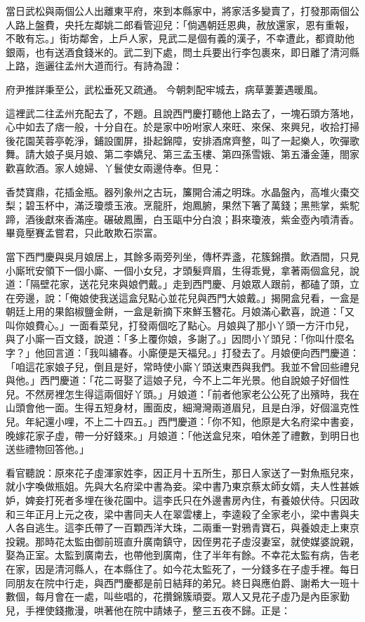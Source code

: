 當日武松與兩個公人出離東平府，來到本縣家中，將家活多變賣了，打發那兩個公人路上盤費，央托左鄰姚二郎看管迎兒：「倘遇朝廷恩典，赦放還家，恩有重報，不敢有忘。」街坊鄰舍，上戶人家，見武二是個有義的漢子，不幸遭此，都資助他銀兩，也有送酒食錢米的。武二到下處，問土兵要出行李包裹來，即日離了清河縣上路，迤邐往孟州大道而行。有詩為證：

府尹推詳秉至公，武松垂死又疏通。
今朝刺配牢城去，病草萋萋遇暖風。

這裡武二往孟州充配去了，不題。且說西門慶打聽他上路去了，一塊石頭方落地，心中如去了痞一般，十分自在。於是家中吩咐家人來旺、來保、來興兒，收拾打掃後花園芙蓉亭乾淨，鋪設圍屏，掛起錦障，安排酒席齊整，叫了一起樂人，吹彈歌舞。請大娘子吳月娘、第二李嬌兒、第三孟玉樓、第四孫雪娥、第五潘金蓮，閤家歡喜飲酒。家人媳婦、丫鬟使女兩邊侍奉。但見：

香焚寶鼎，花插金瓶。器列象州之古玩，簾開合浦之明珠。水晶盤內，高堆火棗交梨；碧玉杯中，滿泛瓊漿玉液。烹龍肝，炮鳳腑，果然下箸了萬錢；黑熊掌，紫駝蹄，酒後獻來香滿座。碾破鳳團，白玉甌中分白浪；斟來瓊液，紫金壺內噴清香。畢竟壓賽孟嘗君，只此敢欺石崇富。

當下西門慶與吳月娘居上，其餘多兩旁列坐，傳杯弄盞，花簇錦攢。飲酒間，只見小廝玳安領下一個小廝、一個小女兒，才頭髮齊眉，生得乖覺，拿著兩個盒兒，說道：「隔壁花家，送花兒來與娘們戴。」走到西門慶、月娘眾人跟前，都磕了頭，立在旁邊，說：「俺娘使我送這盒兒點心並花兒與西門大娘戴。」揭開盒兒看，一盒是朝廷上用的果餡椒鹽金餅，一盒是新摘下來鮮玉簪花。月娘滿心歡喜，說道：「又叫你娘費心。」一面看菜兒，打發兩個吃了點心。月娘與了那小丫頭一方汗巾兒，與了小廝一百文錢，說道：「多上覆你娘，多謝了。」因問小丫頭兒：「你叫什麼名字？」他回言道：「我叫繡春。小廝便是天福兒。」打發去了。月娘便向西門慶道：「咱這花家娘子兒，倒且是好，常時使小廝丫頭送東西與我們。我並不曾回些禮兒與他。」西門慶道：「花二哥娶了這娘子兒，今不上二年光景。他自說娘子好個性兒。不然房裡怎生得這兩個好丫頭。」月娘道：「前者他家老公公死了出殯時，我在山頭會他一面。生得五短身材，團面皮，細灣灣兩道眉兒，且是白淨，好個溫克性兒。年紀還小哩，不上二十四五。」西門慶道：「你不知，他原是大名府梁中書妾，晚嫁花家子虛，帶一分好錢來。」月娘道：「他送盒兒來，咱休差了禮數，到明日也送些禮物回答他。」

看官聽說：原來花子虛渾家姓李，因正月十五所生，那日人家送了一對魚瓶兒來，就小字喚做瓶姐。先與大名府梁中書為妾。梁中書乃東京蔡太師女婿，夫人性甚嫉妒，婢妾打死者多埋在後花園中。這李氏只在外邊書房內住，有養娘伏侍。只因政和三年正月上元之夜，梁中書同夫人在翠雲樓上，李逵殺了全家老小，梁中書與夫人各自逃生。這李氏帶了一百顆西洋大珠，二兩重一對鴉青寶石，與養娘走上東京投親。那時花太監由御前班直升廣南鎮守，因侄男花子虛沒妻室，就使媒婆說親，娶為正室。太監到廣南去，也帶他到廣南，住了半年有餘。不幸花太監有病，告老在家，因是清河縣人，在本縣住了。如今花太監死了，一分錢多在子虛手裡。每日同朋友在院中行走，與西門慶都是前日結拜的弟兄。終日與應伯爵、謝希大一班十數個，每月會在一處，叫些唱的，花攢錦簇頑耍。眾人又見花子虛乃是內臣家勤兒，手裡使錢撒漫，哄著他在院中請婊子，整三五夜不歸。正是：

